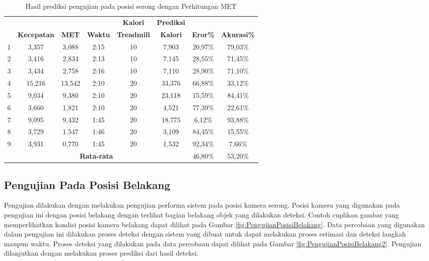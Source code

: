 \begin{longtable}{|c|c|c|c|c|c|c|c|}
  \caption{Hasil prediksi pengujian pada posisi serong dengan Perhitungan MET}
  \label{tb:PengujianPosisiSerongAnalisaPrediksiPerhitungan}                                   \\
  \hline
  \rowcolor[HTML]{C0C0C0}
  & & & & \textbf{Kalori} & \textbf{Prediksi} & & \\
  \rowcolor[HTML]{C0C0C0}
  \multirow{-2}{*}{\textbf{Percobaan}} & \multirow{-2}{*}{\textbf{Kecepatan}} & \multirow{-2}{*}{\textbf{MET}} & \multirow{-2}{*}{\textbf{Waktu}} & \textbf{Treadmill} & \textbf{Kalori} & \multirow{-2}{*}{\textbf{Eror\%}} & \multirow{-2}{*}{\textbf{Akurasi\%}} \\
  \hline
  1   & 3,357   & 3,088    & 2:15    & 10   & 7,903     & 20,97\%     & 79,03\%   \\
  \hline
  2   & 3,416   & 2,834    & 2:13    & 10   & 7,145     & 28,55\%     & 71,45\%   \\
  \hline
  3   & 3,434   & 2,758    & 2:16    & 10   & 7,110     & 28,90\%     & 71,10\%   \\
  \hline
  4   & 15,216  & 13,542   & 2:10    & 20   & 33,376    & 66,88\%     & 33,12\%   \\
  \hline
  5   & 9,034   & 9,380    & 2:10    & 20   & 23,118    & 15,59\%     & 84,41\%   \\
  \hline
  6   & 3,660   & 1,821    & 2:10    & 20   & 4,521     & 77,39\%     & 22,61\%   \\
  \hline
  7   & 9,095   & 9,432    & 1:45    & 20    & 18,775   & 6,12\%      & 93,88\%   \\
  \hline
  8   & 3,729   & 1,547    & 1:46    & 20    & 3,109    & 84,45\%     & 15,55\%   \\
  \hline
  9   & 3,931   & 0,770    & 1:45    & 20    & 1,532    & 92,34\%     & 7,66\%   \\
  \hline

  \multicolumn{6}{|c|}{\textbf{Rata-rata}} & 46,80\% & 53,20\%  \\
  \hline
\end{longtable}

\subsection{Pengujian Pada Posisi Belakang}
\label{subsec:PengujianPosisiBelakang}

Pengujian dilakukan dengan melakukan pengujian performa sistem pada posisi kamera serong. Posisi kamera yang digunakan pada pengujian ini dengan posisi belakang dengan terlihat bagian belakang objek yang dilakukan deteksi. Contoh cuplikan gambar yang memperlihatkan kondisi posisi kamera belakang dapat dilihat pada Gambar \ref{fig:PengujianPosisiBelakang}. Data percobaan yang digunakan dalam pengujian ini dilakukan proses deteksi dengan sistem yang dibuat untuk dapat melakukan proses estimasi dan deteksi langkah maupun waktu. Proses deteksi yang dilakukan pada data percobaan dapat dilihat pada Gambar \ref{fig:PengujianPosisiBelakang2}. Pengujian dilanjutkan dengan melakukan proses prediksi dari hasil deteksi.

